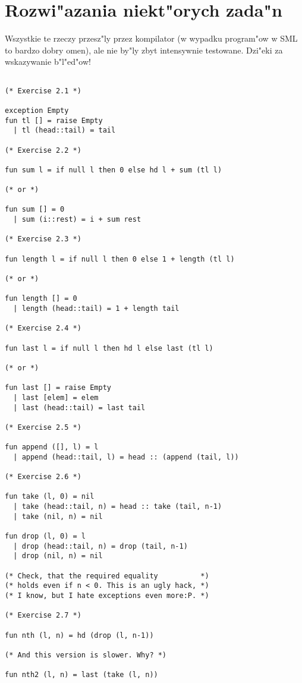 \chapter{
Rozwi"azania niekt"orych zada"n
}

Wszystkie te rzeczy przesz"ly przez kompilator
(w wypadku program"ow w SML to bardzo dobry omen),
ale nie by"ly zbyt intensywnie testowane. 
Dzi"eki za wskazywanie b"l"ed"ow!                     

\begin{verbatim}

(* Exercise 2.1 *) 

exception Empty
fun tl [] = raise Empty
  | tl (head::tail) = tail

(* Exercise 2.2 *) 

fun sum l = if null l then 0 else hd l + sum (tl l)

(* or *)

fun sum [] = 0
  | sum (i::rest) = i + sum rest  

(* Exercise 2.3 *)

fun length l = if null l then 0 else 1 + length (tl l)

(* or *)

fun length [] = 0
  | length (head::tail) = 1 + length tail  

(* Exercise 2.4 *)

fun last l = if null l then hd l else last (tl l)

(* or *)

fun last [] = raise Empty
  | last [elem] = elem
  | last (head::tail) = last tail

(* Exercise 2.5 *)

fun append ([], l) = l
  | append (head::tail, l) = head :: (append (tail, l)) 

(* Exercise 2.6 *)

fun take (l, 0) = nil
  | take (head::tail, n) = head :: take (tail, n-1)
  | take (nil, n) = nil

fun drop (l, 0) = l
  | drop (head::tail, n) = drop (tail, n-1)
  | drop (nil, n) = nil

(* Check, that the required equality          *)
(* holds even if n < 0. This is an ugly hack, *)
(* I know, but I hate exceptions even more:P. *)

(* Exercise 2.7 *)

fun nth (l, n) = hd (drop (l, n-1))

(* And this version is slower. Why? *)

fun nth2 (l, n) = last (take (l, n))


\end{verbatim}
